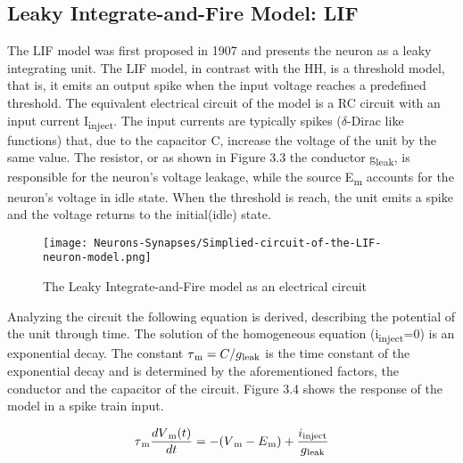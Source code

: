 \documentclass[12pt]{report}
\begin{document}
\medskip

\subsection{Leaky Integrate-and-Fire Model: LIF}

The LIF model was first proposed in 1907 \cite{Brunel2007} and presents the neuron as a leaky integrating unit. The LIF model, in contrast with the HH, is a threshold model, that is, it emits an output spike when the input voltage reaches a predefined threshold. The equivalent electrical circuit of the model is a RC circuit with an input current I\textsubscript{inject}. The input currents are typically spikes (\(\delta\)-Dirac like functions) that, due to the capacitor C, increase the voltage of the unit by the same value. The resistor, or as shown in Figure 3.3 the conductor g\textsubscript{leak}, is responsible for the neuron's voltage leakage, while the source E\textsubscript{m} accounts for the neuron's voltage in idle state. When the threshold is reach, the unit emits a spike and the voltage returns to the initial(idle) state.

\begin{figure}[htp]
    \centering
    \texttt{[image: Neurons-Synapses/Simplied-circuit-of-the-LIF-neuron-model.png]}
    \caption{The Leaky Integrate-and-Fire model as an electrical circuit}
    \label{fig:lif-circuit}
\end{figure}

\vspace{5mm}

Analyzing the circuit the following equation is derived, describing the potential of the unit through time. The solution of the homogeneous equation (i\textsubscript{inject}=0) is an exponential decay. The constant \(\tau\textsubscript{m}=C/g\textsubscript{leak}\) is the time constant of the exponential decay and is determined by the aforementioned factors, the conductor and the capacitor of the circuit. Figure 3.4 shows the response of the model in a spike train input.

\vspace{5mm}

\begin{equation}
\tau\textsubscript{m}\frac{dV\textsubscript{m}(t)}{dt}=-(V\textsubscript{m}-E\textsubscript{m})+\frac{i\textsubscript{inject}}{g\textsubscript{leak}}
\end{equation}

\vspace{5mm}
\end{document}
